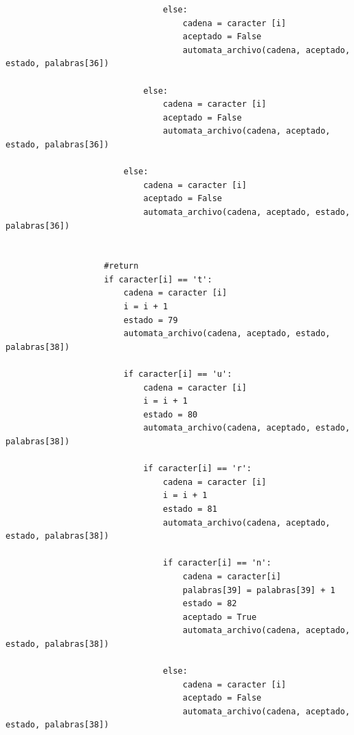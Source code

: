 \documentclass{article}
\begin{document}
\begin{flushleft}
\begin{lstlisting}
                                else:
                                    cadena = caracter [i]
                                    aceptado = False
                                    automata_archivo(cadena, aceptado, estado, palabras[36])
                                    
                            else:
                                cadena = caracter [i]
                                aceptado = False
                                automata_archivo(cadena, aceptado, estado, palabras[36])
                                
                        else:
                            cadena = caracter [i]
                            aceptado = False
                            automata_archivo(cadena, aceptado, estado, palabras[36])
                            
                            
                    #return
                    if caracter[i] == 't':
                        cadena = caracter [i]
                        i = i + 1
                        estado = 79
                        automata_archivo(cadena, aceptado, estado, palabras[38])              
                        
                        if caracter[i] == 'u':
                            cadena = caracter [i]
                            i = i + 1
                            estado = 80
                            automata_archivo(cadena, aceptado, estado, palabras[38])
                            
                            if caracter[i] == 'r':
                                cadena = caracter [i]
                                i = i + 1
                                estado = 81
                                automata_archivo(cadena, aceptado, estado, palabras[38])
                                
                                if caracter[i] == 'n':
                                    cadena = caracter[i]
                                    palabras[39] = palabras[39] + 1
                                    estado = 82
                                    aceptado = True
                                    automata_archivo(cadena, aceptado, estado, palabras[38])
                                    
                                else:
                                    cadena = caracter [i]
                                    aceptado = False
                                    automata_archivo(cadena, aceptado, estado, palabras[38])
                            

\end{lstlisting}
\end{flushleft}
\end{document}

